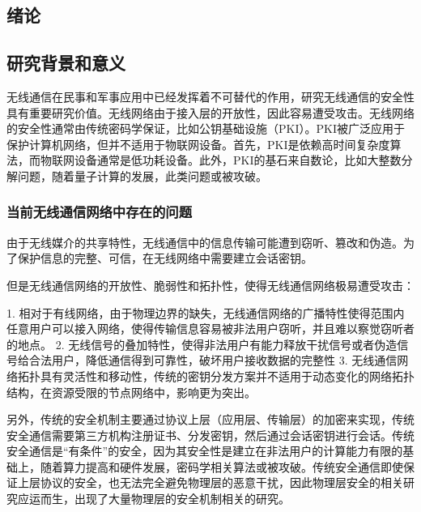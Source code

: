 \documentclass[master]{seuthesis} %
\begin{document}



\begin{Main} %

\chapter{绪论}
\section{研究背景和意义}

无线通信在民事和军事应用中已经发挥着不可替代的作用，研究无线通信的安全性具有重要研究价值。无线网络由于接入层的开放性，因此容易遭受攻击。无线网络的安全性通常由传统密码学保证，比如公钥基础设施（PKI）。PKI被广泛应用于保护计算机网络，但并不适用于物联网设备。首先，PKI是依赖高时间复杂度算法，而物联网设备通常是低功耗设备。此外，PKI的基石来自数论，比如大整数分解问题，随着量子计算的发展，此类问题或被攻破。

\subsection{当前无线通信网络中存在的问题}

由于无线媒介的共享特性，无线通信中的信息传输可能遭到窃听、篡改和伪造。为了保护信息的完整、可信，在无线网络中需要建立会话密钥。

但是无线通信网络的开放性、脆弱性和拓扑性，使得无线通信网络极易遭受攻击：

1. 相对于有线网络，由于物理边界的缺失，无线通信网络的广播特性使得范围内任意用户可以接入网络，使得传输信息容易被非法用户窃听，并且难以察觉窃听者的地点。
2. 无线信号的叠加特性，使得非法用户有能力释放干扰信号或者伪造信号给合法用户，降低通信得到可靠性，破坏用户接收数据的完整性
3. 无线通信网络拓扑具有灵活性和移动性，传统的密钥分发方案并不适用于动态变化的网络拓扑结构，在资源受限的节点网络中，影响更为突出。

另外，传统的安全机制主要通过协议上层（应用层、传输层）的加密来实现，传统安全通信需要第三方机构注册证书、分发密钥，然后通过会话密钥进行会话。传统安全通信是“有条件”的安全，因为其安全性是建立在非法用户的计算能力有限的基础上，随着算力提高和硬件发展，密码学相关算法或被攻破。传统安全通信即使保证上层协议的安全，也无法完全避免物理层的恶意干扰，因此物理层安全的相关研究应运而生，出现了大量物理层的安全机制相关的研究。


\end{Main}
\end{document}
